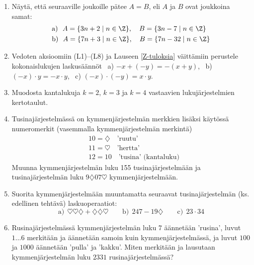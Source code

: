 \Harj
\begin{enumerate}

\item
Näytä, että seuraaville joukoille pätee $A=B$, eli $A$ ja $B$ ovat joukkoina samat:
\begin{align*}
&\text{a)}\ \ A=\{3n+2 \mid n\in\Z\}, \quad B=\{3n-7 \mid n\in\Z\} \\
&\text{b)}\ \ A=\{7n+3 \mid n\in\Z\}, \quad B=\{7n-32 \mid n\in\Z\}
\end{align*}

\item
Vedoten aksioomiin (L1)--(L8) ja Lauseen \ref{Z-tuloksia} väittämiin perustele kokonaislukujen
laskusäännöt \ a) $-x+(-y)=-(x+y)$, \ b) $(-x) \cdot y = - x\cdot y$, \
c) $(-x) \cdot (-y) = x \cdot y$.

\item 
Muodosta kantalukuja $k=2$, $k=3$ ja $k=4$ vastaavien lukujärjestelmien kertotaulut.

\item 
Tusinajärjestelmässä on kymmenjärjestelmän merkkien lisäksi käytössä numeromerkit (vasemmalla 
kymmenjärjestelmän merkintä)
\begin{align*}
&10=\diamondsuit \quad \text{'ruutu'} \\
&11=\heartsuit \quad \text{'hertta'} \\
&12=10 \quad \text{'tusina' (kantaluku)}
\end{align*}
Muunna kymmenjärjestelmän luku 155 tusinajärjestelmään ja tusinajärjestelmän luku 
$9\diamondsuit 07\heartsuit$ kymmenjärjestelmään.

\item 
Suorita kymmenjärjestelmään muuntamatta seuraavat tusinajärjestelmän (ks. edellinen tehtävä) 
laskuoperaatiot:
\[
\text{a)}\ \ \heartsuit\heartsuit\diamondsuit + \diamondsuit\diamondsuit\heartsuit \qquad 
\text{b)}\ \  247-19\diamondsuit \qquad 
\text{c)}\ \ 23 \cdot 34
\]

\item
Rusinajärjestelmässä kymmenjärjestelmän luku $7$ äännetään 'rusina', luvut $1 \ldots 6$ merkitään ja
äännetään samoin kuin kymmenjärjestelmässä, ja luvut $100$ ja $1000$ äännetään 'pulla' ja 'kakku'.
Miten merkitään ja lausutaan kymmenjärjestelmän luku $2331$ rusinajärjestelmässä?




\end{enumerate}
